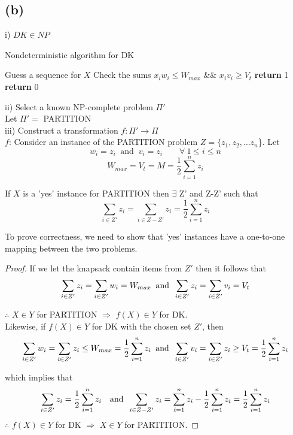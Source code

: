 	\subsection*{(b)}
		 i) $DK \in NP$
			\begin{algorithm}[H]
				\caption{Nondeterministic algorithm for DK}
				\begin{algorithmic}[1]
					\State Guess a sequence for $X$
					\State Check the sums $x_i w_i\leq W_{max}$ \&\& $x_i v_i \geq V_t$ 
					\State \textbf{return} 1
					\Else 
					\State \textbf{return} 0
					\EndIf
				\end{algorithmic}
			\end{algorithm}
		\noindent
		ii) Select a known NP-complete problem $\Pi'$\\
			\indent Let $\Pi' = $ PARTITION\\
		iii) Construct a transformation $f: \Pi' \rightarrow \Pi$\\	
			\indent $f$: Consider an instance of the PARTITION problem $Z = \{z_1, z_2, \dots z_n$\}. Let 
			\[w_i = z_i \: \text{ and }\: v_i = z_i \qquad \forall \: 1 \leq i \leq n\] \[W_{max} = V_t = M = \frac{1}{2}\sum_{i=1}^{n}z_i\]
			
			If $X$ is a 'yes' instance for PARTITION then $\exists$ Z' and Z-Z' such that 
			\[\sum_{i\in Z'}z_i = \sum_{i\in Z-Z'}z_i = \frac{1}{2}\sum_{i=1}^{n}z_i \]
			
			\noindent
			To prove correctness, we need to show that 'yes' instances have a one-to-one mapping between the two problems.
			\begin{proof}
				If we let the knapsack contain items from $Z'$ then it follows that 
				\[ \sum_{i\in Z'}z_i = \sum_{i\in Z'}w_i = W_{max} \text{\: and \:}\sum_{i\in Z'}z_i = \sum_{i\in Z'}v_i = V_t\]
				
				$\therefore$ $X \in Y$ for PARTITION $\Rightarrow$ $f(X) \in Y$ for DK.\\
				
				Likewise, if $f(X)\in Y$ for DK with the chosen set $Z'$, then
				\[\sum_{i\in Z'}w_i = \sum_{i\in Z'}z_i \leq W_{max} = \frac{1}{2}\sum_{i=1}^{n}z_i \text{\: and \:} \sum_{i\in Z'}v_i = \sum_{i\in Z'}z_i \geq V_t = \frac{1}{2}\sum_{i=1}^{n}z_i\]
				
				which implies that
				\[\sum_{i\in Z'}z_i = \frac{1}{2}\sum_{i=1}^{n}z_i \text{\quad and \:} \sum_{i\in Z-Z'}z_i = \sum_{i=1}^{n}z_i - \frac{1}{2}\sum_{i=1}^{n}z_i = \frac{1}{2}\sum_{i=1}^{n}z_i\]
			\indent $\therefore$ $f(X) \in Y$ for DK $\Rightarrow$ $X \in Y$ for PARTITION.
			\end{proof}
			
